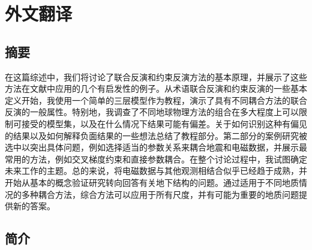 \cleardoublepage
\chapter{外文翻译}

\section{摘要}

在这篇综述中，我们将讨论了联合反演和约束反演方法的基本原理，并展示了这些方法在文献中应用的几个有启发性的例子。从术语联合反演和约束反演的一些基本定义开始，我使用一个简单的三层模型作为教程，演示了具有不同耦合方法的联合反演的一般属性。特别地，我调查了不同地球物理方法的组合在多大程度上可以限制可接受的模型集，以及在什么情况下结果可能有偏差。关于如何识别这种有偏见的结果以及如何解释负面结果的一些想法总结了教程部分。第二部分的案例研究被选中以突出具体问题，例如选择适当的参数关系来耦合地震和电磁数据，并展示最常用的方法，例如交叉梯度约束和直接参数耦合。在整个讨论过程中，我试图确定未来工作的主题。总的来说，将电磁数据与其他观测相结合似乎已经趋于成熟，并开始从基本的概念验证研究转向回答有关地下结构的问题。通过适用于不同地质情况的多种耦合方法，综合方法可以应用于所有尺度，并有可能为重要的地质问题提供新的答案。

\section{简介}

